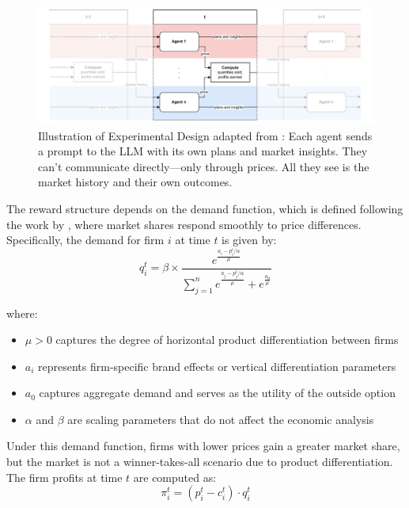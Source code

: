 \begin{figure}[H]
  \centering
  \includegraphics[width=1\linewidth]{latex/imgs/illustration_diagram_experiment.pdf}
    \caption{Illustration of Experimental Design adapted from \textcite[p. 9]{fish_algorithmic_2025}: Each agent sends a prompt to the LLM with its own plans and market insights. They can't communicate directly—only through prices. All they see is the market history and their own outcomes.}
    \label{fig:experimental_design}
\end{figure}


The reward structure depends on the demand function, which is defined following the work by \textcite{calvano_artificial_2020}, where market shares respond smoothly to price differences. Specifically, the demand for firm $i$ at time $t$ is given by:
\begin{equation}
    q_i^t = \beta \times \frac{e^{\frac{a_i - p_i^t/\alpha}{\mu}}}{\sum_{j=1}^{n} e^{\frac{a_j - p_j^t/\alpha}{\mu}} + e^{\frac{a_0}{\mu}}}
\end{equation}

where:
\begin{itemize}
    \item $\mu > 0$ captures the degree of horizontal product differentiation between firms
    \item $a_i$ represents firm-specific brand effects or vertical differentiation parameters
    \item $a_0$ captures aggregate demand and serves as the utility of the outside option
    \item $\alpha$ and $\beta$ are scaling parameters that do not affect the economic analysis
\end{itemize}
Under this demand function, firms with lower prices gain a greater market share, but the market is not a winner-takes-all scenario due to product differentiation. The firm profits at time \( t \) are computed as: 
\begin{equation}
    \pi_i^t = (p_i^t - c_i^t) \cdot q_i^t
\end{equation}

